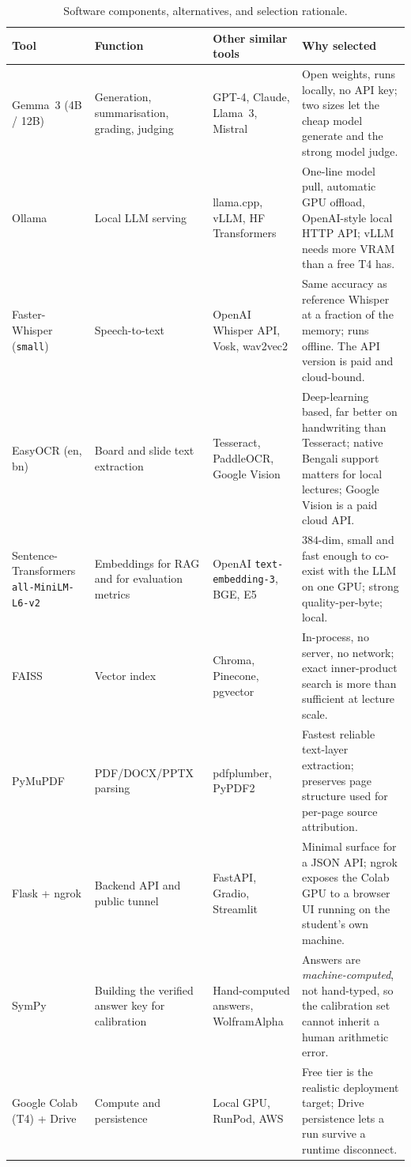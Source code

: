 \begin{table}[H]
\centering
\caption{Software components, alternatives, and selection rationale.}
\label{tab:tools}
\footnotesize
\begin{tabular}{|p{2.6cm}|p{3.0cm}|p{3.2cm}|p{4.4cm}|}
\hline
\textbf{Tool} & \textbf{Function} & \textbf{Other similar tools} & \textbf{Why selected} \\
\hline
Gemma~3 (4B / 12B) & Generation, summarisation, grading, judging &
GPT-4, Claude, Llama~3, Mistral &
Open weights, runs locally, no API key; two sizes let the cheap model generate and
the strong model judge. \\
\hline
Ollama & Local LLM serving &
llama.cpp, vLLM, HF Transformers &
One-line model pull, automatic GPU offload, OpenAI-style local HTTP API; vLLM needs
more VRAM than a free T4 has. \\
\hline
Faster-Whisper (\texttt{small}) & Speech-to-text &
OpenAI Whisper API, Vosk, wav2vec2 &
Same accuracy as reference Whisper at a fraction of the memory; runs offline. The
API version is paid and cloud-bound. \\
\hline
EasyOCR (en, bn) & Board and slide text extraction &
Tesseract, PaddleOCR, Google Vision &
Deep-learning based, far better on handwriting than Tesseract; native Bengali
support matters for local lectures; Google Vision is a paid cloud API. \\
\hline
Sentence-Transformers \texttt{all-MiniLM-L6-v2} & Embeddings for RAG and for evaluation metrics &
OpenAI \texttt{text-embedding-3}, BGE, E5 &
$384$-dim, small and fast enough to co-exist with the LLM on one GPU; strong
quality-per-byte; local. \\
\hline
FAISS & Vector index &
Chroma, Pinecone, pgvector &
In-process, no server, no network; exact inner-product search is more than
sufficient at lecture scale. \\
\hline
PyMuPDF~\cite{pymupdf} & PDF/DOCX/PPTX parsing &
pdfplumber, PyPDF2 &
Fastest reliable text-layer extraction; preserves page structure used for
per-page source attribution. \\
\hline
Flask + ngrok & Backend API and public tunnel &
FastAPI, Gradio, Streamlit &
Minimal surface for a JSON API; ngrok exposes the Colab GPU to a browser UI running
on the student's own machine. \\
\hline
SymPy & Building the verified answer key for calibration &
Hand-computed answers, WolframAlpha &
Answers are \emph{machine-computed}, not hand-typed, so the calibration set cannot
inherit a human arithmetic error. \\
\hline
Google Colab (T4) + Drive & Compute and persistence &
Local GPU, RunPod, AWS &
Free tier is the realistic deployment target; Drive persistence lets a run survive
a runtime disconnect. \\
\hline
\end{tabular}
\end{table}

